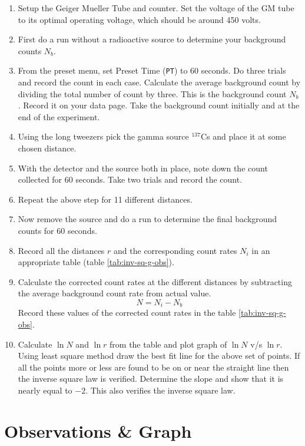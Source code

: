	\begin{enumerate}
		\item 	 Setup the Geiger Mueller Tube and counter. Set the voltage of the GM tube to its optimal operating voltage, which should be around 450 volts.
		\item 	 First do a run without a radioactive source to determine your background counts $ N_b $.
		\item 	 From the preset menu, set Preset Time (\texttt{PT}) to 60 seconds. Do three trials and record the count in each case. Calculate the average background count by dividing the total number of count by three. This is the background count $ N_b $. Record it on your data page. Take the background count initially and at the end of the experiment.
		\item  	Using the long tweezers pick the gamma source $ ^{137} $Cs and place it at some chosen distance.
		\item 	With the detector and the source both in place, note down the count collected for 60 seconds. Take two trials and record the count.
		\item  Repeat the above step for 11 different distances.
		\item 	Now remove the source and do a run to determine the final background counts for 60 seconds.
		\item 	Record all the distances $ r $ and the corresponding count rates $ N_i $ in an appropriate table (table \ref{tab:inv-sq-g-obs}).
		\item 	Calculate the corrected count rates at the different distances by subtracting the average background count rate from actual value. 
		\begin{equation}\label{eqn:background-count}
			N = N_i - N_b
		\end{equation}
		Record these values of the corrected count rates in the table \ref{tab:inv-sq-g-obs}.
		\item 	Calculate $ \ln N $ and $ \ln r $ from the table and plot graph of $ \ln N $ v/s $ \ln r $. Using least square method draw the best fit line for the above set of points. If all the points more or less are found to be on or near the straight line then the inverse square law is verified. Determine the slope and show that it is nearly equal to $ -2 $. This also verifies the inverse square law.
		
	\end{enumerate}
	
	\section{Observations \& Graph}
	
